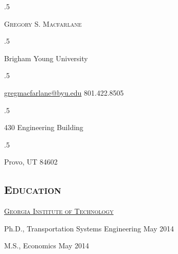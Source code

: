 \documentclass[margin,line]{res}
\newenvironment{list1}{
  \begin{list}{\ding{113}}{%
      \setlength{\itemsep}{0in}
      \setlength{\parsep}{0in} \setlength{\parskip}{0in}
      \setlength{\topsep}{0in} \setlength{\partopsep}{0in}
      \setlength{\leftmargin}{0.17in}}}{\end{list}}
\newenvironment{list2}{
  \begin{list}{$\bullet$}{%
      \setlength{\itemsep}{0in}
      \setlength{\parsep}{0in} \setlength{\parskip}{0in}
      \setlength{\topsep}{0in} \setlength{\partopsep}{0in}
      \setlength{\leftmargin}{0.2in}}}{\end{list}}
\newcommand{\secfont}{\scshape }
\newcommand{\acc}{\scshape }
\begin{document}
 \moveleft.5\hoffset\centerline{\LARGE\scshape Gregory S.  Macfarlane}
\vspace{.05in}
 \moveleft.5\hoffset\centerline{Brigham Young University}
 \moveleft.5\hoffset\centerline{
	 \href{mailto:gregmacfarlane@byu.edu}{gregmacfarlane@byu.edu}
   801.422.8505}
\vspace{.05in}
 \moveleft.5\hoffset\centerline{430 Engineering Building}
 \moveleft.5\hoffset\centerline{Provo, UT 84602}

\begin{resume}

\vspace{.05in}



\section{\secfont Education}
\href{http://www.gatech.edu}{\acc Georgia Institute of Technology}
\\
	\vspace*{-.1in}
	\begin{list1}
	\item[] Ph.D., Transportation Systems Engineering  \hfill{May 2014}
	\vspace*{.05in}
	\item[]M.S., Economics \hfill{May 2014}
	\end{list1}


\end{resume}
\end{document}
